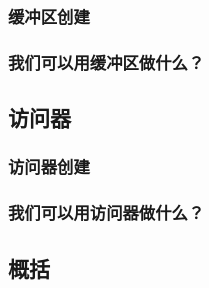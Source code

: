 \subsubsection{缓冲区创建}

\subsubsection{我们可以用缓冲区做什么？}

\subsection{访问器}

\subsubsection{访问器创建}

\subsubsection{我们可以用访问器做什么？}

\subsection{概括}